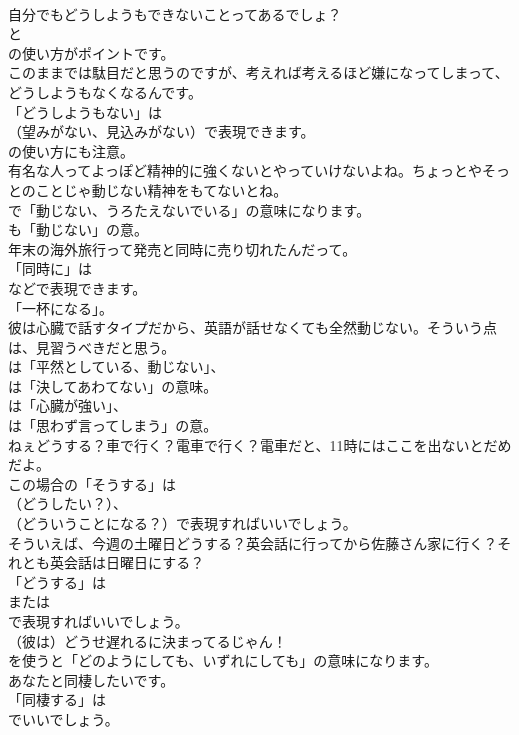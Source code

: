 \documentclass[8pt]{extreport}
\begin{document}
\begin{CJK}{UTF8}{min}
\\	自分でもどうしようもできないことってあるでしょ？ 
\\	と 
\\	の使い方がポイントです。	
\\	このままでは駄目だと思うのですが、考えれば考えるほど嫌になってしまって、どうしようもなくなるんです。 
\\	「どうしようもない」は
\\	（望みがない、見込みがない）で表現できます。
\\	の使い方にも注意。	
\\	有名な人ってよっぽど精神的に強くないとやっていけないよね。ちょっとやそっとのことじゃ動じない精神をもてないとね。 
\\	で「動じない、うろたえないでいる」の意味になります。
\\	も「動じない」の意。	
\\	年末の海外旅行って発売と同時に売り切れたんだって。 
\\	「同時に」は
\\	などで表現できます。
\\	「一杯になる」。	
\\	彼は心臓で話すタイプだから、英語が話せなくても全然動じない。そういう点は、見習うべきだと思う。 
\\	は「平然としている、動じない」、
\\	は「決してあわてない」の意味。
\\	は「心臓が強い」、
\\	は「思わず言ってしまう」の意。	
\\	ねぇどうする？車で行く？電車で行く？電車だと、11時にはここを出ないとだめだよ。 
\\	この場合の「そうする」は
\\	（どうしたい？）、
\\	（どういうことになる？）で表現すればいいでしょう。	
\\	そういえば、今週の土曜日どうする？英会話に行ってから佐藤さん家に行く？それとも英会話は日曜日にする？ 
\\	「どうする」は
\\	または 
\\	で表現すればいいでしょう。	
\\	（彼は）どうせ遅れるに決まってるじゃん！ 
\\	を使うと「どのようにしても、いずれにしても」の意味になります。	
\\	あなたと同棲したいです。 
\\	「同棲する」は 
\\	でいいでしょう。

\end{CJK}
\end{document}
